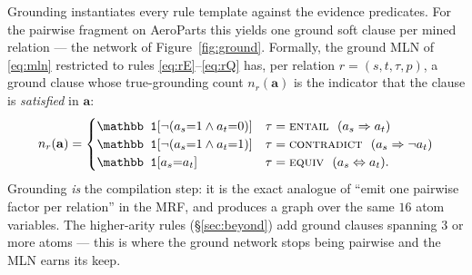 \documentclass[11pt]{article}
\newcommand{\Ent}{\textsc{entail}}
\newcommand{\Con}{\textsc{contradict}}
\newcommand{\Equ}{\textsc{equiv}}
\begin{document}
Grounding instantiates every rule template against the evidence predicates. For the
pairwise fragment on AeroParts this yields one ground soft clause per mined relation --- the
network of Figure~\ref{fig:ground}. Formally, the ground MLN of \eqref{eq:mln} restricted to
rules \eqref{eq:rE}--\eqref{eq:rQ} has, per relation $r=(s,t,\tau,p)$, a ground clause whose
true-grounding count $n_r(\mathbf a)$ is the indicator that the clause is \emph{satisfied} in
$\mathbf a$:
\[
  n_r(\mathbf a)=
  \begin{cases}
    \mathbb 1[\neg(a_s{=}1\wedge a_t{=}0)] & \tau=\Ent \ \ (\text{$a_s\Rightarrow a_t$})\\
    \mathbb 1[\neg(a_s{=}1\wedge a_t{=}1)] & \tau=\Con \ \ (\text{$a_s\Rightarrow\neg a_t$})\\
    \mathbb 1[a_s{=}a_t]                    & \tau=\Equ \ \ (\text{$a_s\Leftrightarrow a_t$}).
  \end{cases}
\]
Grounding \emph{is} the compilation step: it is the exact analogue of ``emit one pairwise
factor per relation'' in the MRF, and produces a graph over the same $16$ atom variables.
The higher-arity rules (\S\ref{sec:beyond}) add ground clauses spanning $3$ or more atoms ---
this is where the ground network stops being pairwise and the MLN earns its keep.
\end{document}
